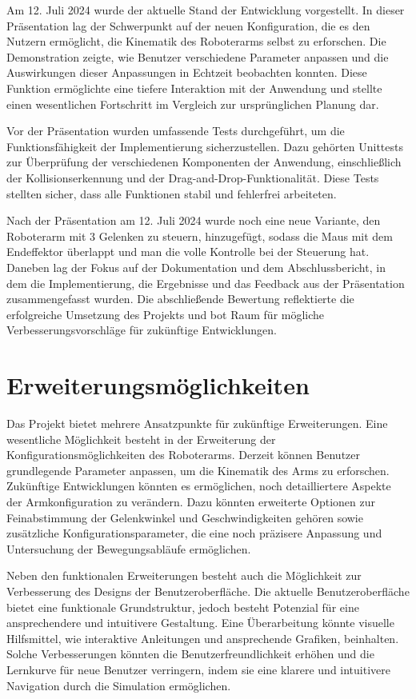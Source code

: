 \documentclass[12pt]{article}
\begin{document}
    Am 12. Juli 2024 wurde der aktuelle Stand der Entwicklung vorgestellt. In dieser Präsentation lag der
    Schwerpunkt auf der neuen Konfiguration, die es den Nutzern ermöglicht, die Kinematik des Roboterarms
    selbst zu erforschen. Die Demonstration zeigte, wie Benutzer verschiedene Parameter anpassen und die
    Auswirkungen dieser Anpassungen in Echtzeit beobachten konnten. Diese Funktion ermöglichte eine tiefere
    Interaktion mit der Anwendung und stellte einen wesentlichen Fortschritt im Vergleich zur ursprünglichen
    Planung dar.

    Vor der Präsentation wurden umfassende Tests durchgeführt, um die Funktionsfähigkeit der Implementierung
    sicherzustellen. Dazu gehörten Unittests zur Überprüfung der verschiedenen Komponenten der Anwendung,
    einschließlich der Kollisionserkennung und der Drag-and-Drop-Funktionalität. Diese Tests stellten sicher,
    dass alle Funktionen stabil und fehlerfrei arbeiteten.

    Nach der Präsentation am 12. Juli 2024 wurde noch eine neue Variante, den Roboterarm mit 3 Gelenken zu
    steuern, hinzugefügt, sodass die Maus mit dem Endeffektor überlappt und man die volle Kontrolle bei der
    Steuerung hat. Daneben lag der Fokus auf der Dokumentation und dem Abschlussbericht, in dem die
    Implementierung, die Ergebnisse und das Feedback aus der Präsentation zusammengefasst wurden. Die
    abschließende Bewertung reflektierte die erfolgreiche Umsetzung des Projekts und bot Raum für mögliche
    Verbesserungsvorschläge für zukünftige Entwicklungen.


    \section{Erweiterungsmöglichkeiten}
    Das Projekt bietet mehrere Ansatzpunkte für zukünftige Erweiterungen. Eine wesentliche Möglichkeit besteht
    in der Erweiterung der Konfigurationsmöglichkeiten des Roboterarms. Derzeit können Benutzer grundlegende
    Parameter anpassen, um die Kinematik des Arms zu erforschen. Zukünftige Entwicklungen könnten es ermöglichen,
    noch detailliertere Aspekte der Armkonfiguration zu verändern. Dazu könnten erweiterte Optionen zur
    Feinabstimmung der Gelenkwinkel und Geschwindigkeiten gehören sowie zusätzliche Konfigurationsparameter,
    die eine noch präzisere Anpassung und Untersuchung der Bewegungsabläufe ermöglichen.

    Neben den funktionalen Erweiterungen besteht auch die Möglichkeit zur Verbesserung des Designs der
    Benutzeroberfläche. Die aktuelle Benutzeroberfläche bietet eine funktionale Grundstruktur, jedoch besteht
    Potenzial für eine ansprechendere und intuitivere Gestaltung. Eine Überarbeitung könnte visuelle Hilfsmittel,
    wie interaktive Anleitungen und ansprechende Grafiken, beinhalten. Solche Verbesserungen könnten die
    Benutzerfreundlichkeit erhöhen und die Lernkurve für neue Benutzer verringern, indem sie eine klarere
    und intuitivere Navigation durch die Simulation ermöglichen.
\end{document}
